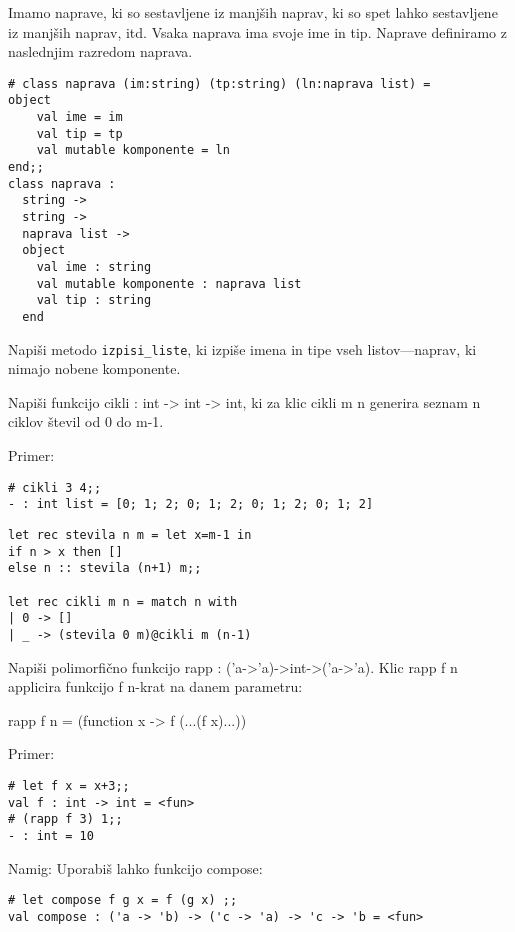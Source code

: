 \begin{ex}
  Imamo naprave, ki so sestavljene iz manj\v sih naprav, ki so spet
  lahko sestavljene iz manj\v sih naprav, itd. Vsaka naprava ima svoje
  ime in tip. Naprave definiramo z naslednjim razredom naprava.

\begin{verbatim}
# class naprava (im:string) (tp:string) (ln:naprava list) = 
object 
    val ime = im 
    val tip = tp 
    val mutable komponente = ln 
end;; 
class naprava : 
  string -> 
  string -> 
  naprava list -> 
  object 
    val ime : string 
    val mutable komponente : naprava list 
    val tip : string 
  end 
\end{verbatim}

  Napi\v si metodo \texttt{izpisi\_liste}, ki izpi\v se imena in tipe
  vseh listov—naprav, ki nimajo nobene komponente.



\end{ex} 
\begin{ex}
  Napi\v si funkcijo cikli : int -> int -> int, ki za klic cikli m n
  generira seznam n ciklov \v stevil od 0 do m-1.

\noindent\/Primer:
\begin{verbatim}
# cikli 3 4;; 
- : int list = [0; 1; 2; 0; 1; 2; 0; 1; 2; 0; 1; 2]
\end{verbatim}

\begin{sol}
\begin{verbatim}
let rec stevila n m = let x=m-1 in
if n > x then []
else n :: stevila (n+1) m;;

let rec cikli m n = match n with
| 0 -> []
| _ -> (stevila 0 m)@cikli m (n-1)
\end{verbatim}
\end{sol}

\end{ex} 
\begin{ex}
  Napi\v si polimorfi\v cno funkcijo rapp :
  ('a->'a)->int->('a->'a). Klic rapp f n applicira funkcijo f n-krat
  na danem parametru:

  rapp f n = (function x -> f (...(f x)...))     

\noindent\/Primer:            
\begin{verbatim}
# let f x = x+3;; 
val f : int -> int = <fun> 
# (rapp f 3) 1;; 
- : int = 10 

\end{verbatim}

Namig: Uporabi\v s lahko funkcijo compose:

\begin{verbatim}
# let compose f g x = f (g x) ;; 
val compose : ('a -> 'b) -> ('c -> 'a) -> 'c -> 'b = <fun> 
\end{verbatim}

\end{ex} 
